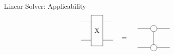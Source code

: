 \begin{frame}{Linear Solver: Applicability}
\begin{equation}
{{{\begin{tikzpicture}[baseline=0.5]
                        \node[draw=none, circle,radius=\radius] (L0) at (-1,0) {};
                        \node[draw=none, circle,radius=\radius] (L1) at (-1,1) {};

                        \draw (-0.3,1.3) -- (0.3,1.3) -- (0.3,-0.3) -- (-0.3,-0.3) -- cycle;

                        \node[draw=none, circle,radius=\radius] (R0) at (1,0) {};
                        \node[draw=none, circle,radius=\radius] (R1) at (1,1) {};

                        \draw (L0) --   (-0.3,0);
                        \draw (L1) --   (-0.3,1);

                        \draw (R0) --   (0.3,0);
                        \draw (R1) --   (0.3,1);

                        \node[draw=none] (C0) at (0,0.5) {X};
                    \end{tikzpicture} }} =  \vcenter{\hbox{  \begin{tikzpicture}[baseline=0.5]

                        \def \legLength { 0.8}
                        \def \radius {0.1}

                        \pgfmathsetmacro{\step}{2*\radius+ \legLength} %
                        \pgfmathsetmacro{\legpos}{\radius+\legLength} %

                        \node[draw=none, circle,radius=\radius] (L0) at (-1,0) {};
                        \node[draw=none, circle,radius=\radius] (L1) at (-1,1) {};

                        \node[draw, circle,radius=\radius] (C0) at (0,0) {};
                        \node[draw, circle,radius=\radius] (C1) at (0,1) {};

                        \node[draw=none, circle,radius=\radius] (R0) at (1,0) {};
                        \node[draw=none, circle,radius=\radius] (R1) at (1,1) {};

                        \draw (L0) --   (C0);
                        \draw (L1) --   (C1);

                        \draw (R0) --   (C0);
                        \draw (R1) --   (C1);

                        \draw (C1) --   (C0);

                    \end{tikzpicture} }}}
    \end{equation}
\end{frame}

